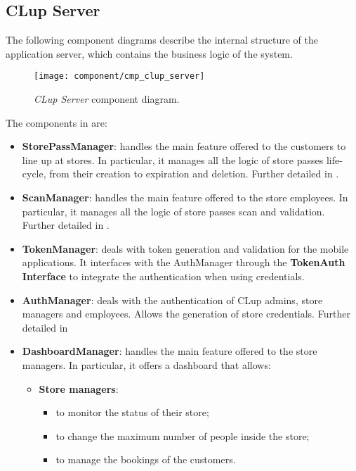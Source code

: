 \clearpage

\subsection{CLup Server}
The following component diagrams describe the internal structure of the application server, which contains the business logic of the system.

\begin{figure}[H]
	\centering
	\texttt{[image: component/cmp\_clup\_server]}
	\caption{\textit{CLup Server} component diagram.}
	\label{fig:cmp_clup_server}
\end{figure}
\clearpage

The components in  are:
\begin{itemize}
	\item \textbf{StorePassManager}: handles the main feature offered to the customers to line up at stores. In particular, it manages all the logic of store passes life-cycle, from their creation to expiration and deletion. Further detailed in .
	
	\item \textbf{ScanManager}: handles the main feature offered to the store employees. In particular, it manages all the logic of store passes scan and validation. Further detailed in .
	
	\item \textbf{TokenManager}: deals with token generation and validation for the mobile applications. It interfaces with the AuthManager through the \textbf{TokenAuth Interface} to integrate the authentication when using credentials.
	
	\item \textbf{AuthManager}: deals with the authentication of CLup admins, store managers and employees. Allows the generation of store credentials. Further detailed in 
	
	\item \textbf{DashboardManager}: handles the main feature offered to the store managers. In particular, it offers a dashboard that allows:
	\begin{itemize}
		\item \textbf{Store managers}:
				\begin{itemize}
					\item to monitor the status of their store;
					\item to change the maximum number of people inside the store;
					\item to manage the bookings of the customers.
				\end{itemize}
			

\end{itemize}
\end{itemize}
